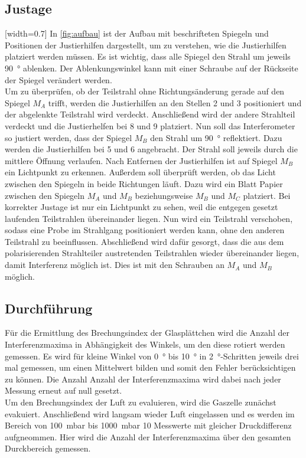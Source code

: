 \subsection{Justage}
[width=0.7\textwidth]
In \autoref{fig:aufbau} ist der Aufbau mit beschrifteten Spiegeln und Positionen der Justierhilfen dargestellt, um zu verstehen, wie die Justierhilfen platziert werden müssen. Es ist wichtig, dass alle Spiegel den Strahl um jeweils \SI{90}{\degree} ablenken. Der Ablenkungswinkel kann mit einer Schraube auf der Rückseite der Spiegel verändert werden.\\
Um zu überprüfen, ob der Teilstrahl ohne Richtungsänderung gerade auf den Spiegel $M_A$ trifft, werden die Justierhilfen an den Stellen 2 und 3 positioniert und der abgelenkte Teilstrahl wird verdeckt. Anschließend wird der andere Strahlteil verdeckt und die Justierhelfen bei 8 und 9 platziert. Nun soll das Interferometer so justiert werden, dass der Spiegel $M_B$ den Strahl um \SI{90}{\degree} reflektiert. Dazu werden die Justierhilfen bei 5 und 6 angebracht. Der Strahl soll jeweils durch die mittlere Öffnung verlaufen. Nach Entfernen der Justierhilfen ist auf Spiegel $M_B$ ein Lichtpunkt zu erkennen. Außerdem soll überprüft werden, ob das Licht zwischen den Spiegeln in beide Richtungen läuft. Dazu wird ein Blatt Papier zwischen den Spiegeln $M_A$ und $M_B$ beziehungsweise $M_B$ und $M_C$ platziert. Bei korrekter Justage ist nur ein Lichtpunkt zu sehen, weil die entgegen gesetzt laufenden Teilstrahlen übereinander liegen. Nun wird ein Teilstrahl verschoben, sodass eine Probe im Strahlgang positioniert werden kann, ohne den anderen Teilstrahl zu beeinflussen. Abschließend wird dafür gesorgt, dass die aus dem polarisierenden Strahlteiler austretenden Teilstrahlen wieder übereinander liegen, damit Interferenz möglich ist. Dies ist mit den Schrauben an $M_A$ und $M_B$ möglich.

\subsection{Durchführung}
Für die Ermittlung des Brechungsindex der Glasplättchen wird die Anzahl der Interferenzmaxima in Abhängigkeit des Winkels, um den diese rotiert werden gemessen. Es wird für kleine Winkel von \SI{0}{\degree} bis \SI{10}{\degree} in \SI{2}{\degree}-Schritten jeweils drei mal gemessen, um einen Mittelwert bilden und somit den Fehler berücksichtigen zu können. Die Anzahl Anzahl der Interferenzmaxima wird dabei nach jeder Messung erneut auf null gesetzt.\\
Um den Brechungsindex der Luft zu evaluieren, wird die Gaszelle zunächst evakuiert. Anschließend wird langsam wieder Luft eingelassen und es werden im Bereich von \SI{100}{\milli\bar} bis \SI{1000}{\milli\bar} 10 Messwerte mit gleicher Druckdifferenz aufgneommen. Hier wird die Anzahl der Interferenzmaxima über den gesamten Durckbereich gemessen.
